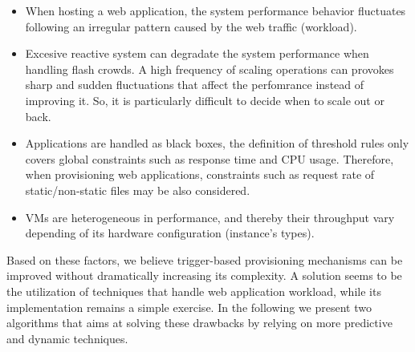 \begin{itemize}
\item  When hosting a web application, the system performance behavior fluctuates following an irregular pattern caused by the web traffic (workload). 


\item Excesive reactive system can degradate the system performance when handling flash crowds. A high frequency of scaling operations can provokes sharp and sudden fluctuations that affect the perfomrance instead of improving it. So, it is particularly difficult to decide when to scale out or back. 

\item Applications are handled as black boxes, the definition of threshold rules only covers global constraints such as response time and CPU usage. Therefore, when provisioning web applications, constraints such as request rate of static/non-static files may be also considered.



\item VMs are heterogeneous in performance, and thereby their throughput vary depending of its hardware configuration (instance's types).


\end{itemize}

Based on these factors, we believe trigger-based provisioning mechanisms can be improved without dramatically increasing its complexity. A solution seems to be the utilization of techniques that handle web application workload, while its implementation remains a simple exercise. In the following we present two algorithms that aims at solving these drawbacks by relying on more predictive and dynamic techniques.





